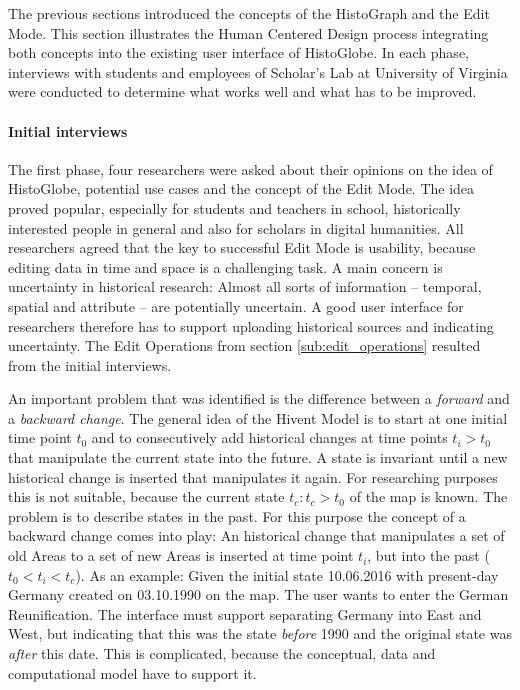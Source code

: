 The previous sections introduced the concepts of the HistoGraph and the Edit Mode. This section illustrates the Human Centered Design process integrating both concepts into the existing user interface of HistoGlobe. In each phase, interviews with students and employees of Scholar's Lab at University of Virginia were conducted to determine what works well and what has to be improved.

\paragraph{Initial interviews} %
\label{par:initial_interviews}

The first phase, four researchers were asked about their opinions on the idea of HistoGlobe, potential use cases and the concept of the Edit Mode. The idea proved popular, especially for students and teachers in school, historically interested people in general and also for scholars in digital humanities. All researchers agreed that the key to successful Edit Mode is usability, because editing data in time and space is a challenging task. A main concern is uncertainty in historical research: Almost all sorts of information -- temporal, spatial and attribute -- are potentially uncertain. A good user interface for researchers therefore has to support uploading historical sources and indicating uncertainty. The Edit Operations from section \ref{sub:edit_operations} resulted from the initial interviews.

An important problem that was identified is the difference between a \emph{forward} and a \emph{backward change}. The general idea of the Hivent Model is to start at one initial time point $t_0$ and to consecutively add historical changes at time points $t_i > t_0$ that manipulate the current state into the future. A state is invariant until a new historical change is inserted that manipulates it again. For researching purposes this is not suitable, because the current state $t_c: t_c > t_0$ of the map is known. The problem is to describe states in the past. For this purpose the concept of a backward change comes into play: An historical change that manipulates a set of old Areas to a set of new Areas is inserted at time point $t_i$, but into the past ($ t_0 < t_i < t_c$). As an example: Given the initial state 10.06.2016 with present-day Germany created on 03.10.1990 on the map. The user wants to enter the German Reunification. The interface must support separating Germany into East and West, but indicating that this was the state \emph{before} 1990 and the original state was \emph{after} this date. This is complicated, because the conceptual, data and computational model have to support it.

